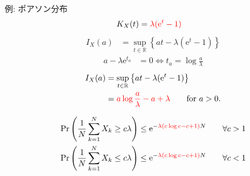 \documentclass[lualatex,handout]{beamer}
\newcommand{\emm}[1]{\textcolor{red}{#1}}
\theoremstyle{definition}
\begin{document}
\begin{frame}{例: ポアソン分布}
\begin{align*}
K_X(t) &= \emm{\lambda(\mathrm{e}^t-1)}
\end{align*}
\begin{align*}
I_X(a)&=\sup_{t\in\mathbb{R}}\left\{at - \lambda(\mathrm{e}^t-1)\right\}
\end{align*}
\begin{align*}
a-\lambda\mathrm{e}^{t_a} &= 0\iff t_a = \log \frac{a}{\lambda}
\end{align*}
\begin{align*}
I_X(a)&=\sup_{t\in\mathbb{R}}\left\{at - \lambda(\mathrm{e}^t-1)\right\}\\
 &= \emm{a\log\frac{a}{\lambda} -a + \lambda} \qquad\text{for } a > 0.
\end{align*}

\vspace{.5em}
\begin{align*}
\Pr\left(\frac1N\sum_{k=1}^N X_k \ge c\lambda\right) &\le \mathrm{e}^{-\emm{\lambda\left(c\log c -c + 1 \right)}N}\qquad\forall c > 1\\
\Pr\left(\frac1N\sum_{k=1}^N X_k \le c\lambda\right) &\le \mathrm{e}^{-\emm{\lambda\left(c\log c -c + 1 \right)}N}\qquad\forall c < 1\\
\end{align*}
\end{frame}
\end{document}
